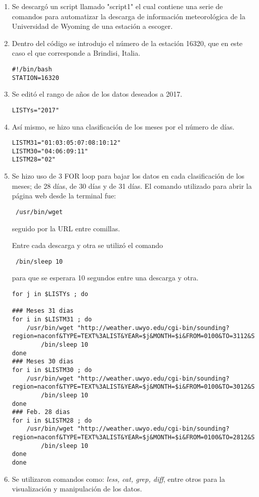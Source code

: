 \documentclass[a4paper]{article}
\begin{document}
\begin{enumerate}


\item Se descargó un script llamado "script1" el cual contiene una serie de comandos para automatizar la descarga de información meteorológica de la Universidad de Wyoming de una estación a escoger.

\item Dentro del código se introdujo el número de la estación 16320, que en este caso el que corresponde a Brindisi, Italia.

\begin{verbatim}
#!/bin/bash
STATION=16320
\end{verbatim}

\item Se editó el rango de años de los datos deseados a 2017. 

\begin{verbatim}
LISTYs="2017"
\end{verbatim}

\item Así mismo, se hizo una clasificación de los meses por el número de días.


\begin{verbatim}
LISTM31="01:03:05:07:08:10:12"
LISTM30="04:06:09:11"
LISTM28="02"
\end{verbatim}

\item Se hizo uso de 3 FOR loop para bajar los datos en cada clasificación de los meses; de 28 días, de 30 días y de 31 días. El comando utilizado para abrir la página web desde la terminal fue: \begin{verbatim} /usr/bin/wget \end{verbatim}  seguido por la URL entre comillas. 

\newpage

Entre cada descarga y otra se utilizó el comando \begin{verbatim} /bin/sleep 10 \end{verbatim}  para que se esperara 10 segundos entre una descarga y otra. 


\begin{verbatim}
for j in $LISTYs ; do

### Meses 31 dias
for i in $LISTM31 ; do
	/usr/bin/wget "http://weather.uwyo.edu/cgi-bin/sounding?region=naconf&TYPE=TEXT%3ALIST&YEAR=$j&MONTH=$i&FROM=0100&TO=3112&STNM=$STATION"
        /bin/sleep 10
done
### Meses 30 dias
for i in $LISTM30 ; do
	/usr/bin/wget "http://weather.uwyo.edu/cgi-bin/sounding?region=naconf&TYPE=TEXT%3ALIST&YEAR=$j&MONTH=$i&FROM=0100&TO=3012&STNM=$STATION"
        /bin/sleep 10
done
### Feb. 28 dias
for i in $LISTM28 ; do
	/usr/bin/wget "http://weather.uwyo.edu/cgi-bin/sounding?region=naconf&TYPE=TEXT%3ALIST&YEAR=$j&MONTH=$i&FROM=0100&TO=2812&STNM=$STATION"
        /bin/sleep 10
done
done
\end{verbatim}

\item Se utilizaron comandos como: \textit{less, cat, grep, diff}, entre otros para la visualización y manipulación de los datos.
\end{enumerate}
\end{document}
